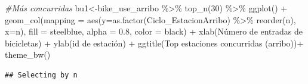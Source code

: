 \documentclass[
]{article}
\newenvironment{Shaded}{\begin{snugshade}}{\end{snugshade}}
\newcommand{\AttributeTok}[1]{\textcolor[rgb]{0.77,0.63,0.00}{#1}}
\newcommand{\CommentTok}[1]{\textcolor[rgb]{0.56,0.35,0.01}{\textit{#1}}}
\newcommand{\DecValTok}[1]{\textcolor[rgb]{0.00,0.00,0.81}{#1}}
\newcommand{\FloatTok}[1]{\textcolor[rgb]{0.00,0.00,0.81}{#1}}
\newcommand{\FunctionTok}[1]{\textcolor[rgb]{0.00,0.00,0.00}{#1}}
\newcommand{\NormalTok}[1]{#1}
\newcommand{\OtherTok}[1]{\textcolor[rgb]{0.56,0.35,0.01}{#1}}
\newcommand{\SpecialCharTok}[1]{\textcolor[rgb]{0.00,0.00,0.00}{#1}}
\newcommand{\StringTok}[1]{\textcolor[rgb]{0.31,0.60,0.02}{#1}}
\begin{document}
\begin{Shaded}
\begin{Highlighting}[]
\CommentTok{\#Más concurridas}
\NormalTok{bu1}\OtherTok{\textless{}{-}}\NormalTok{bike\_use\_arribo }\SpecialCharTok{\%\textgreater{}\%} 
    \FunctionTok{top\_n}\NormalTok{(}\DecValTok{30}\NormalTok{) }\SpecialCharTok{\%\textgreater{}\%} 
    \FunctionTok{ggplot}\NormalTok{() }\SpecialCharTok{+}
    \FunctionTok{geom\_col}\NormalTok{(}\AttributeTok{mapping =} \FunctionTok{aes}\NormalTok{(}\AttributeTok{y=}\FunctionTok{as.factor}\NormalTok{(Ciclo\_EstacionArribo) }\SpecialCharTok{\%\textgreater{}\%} 
                               \FunctionTok{reorder}\NormalTok{(n),}
                           \AttributeTok{x=}\NormalTok{n),}
             \AttributeTok{fill =} \StringTok{\textquotesingle{}steelblue\textquotesingle{}}\NormalTok{,}
             \AttributeTok{alpha =} \FloatTok{0.8}\NormalTok{,}
             \AttributeTok{color =} \StringTok{\textquotesingle{}black\textquotesingle{}}\NormalTok{) }\SpecialCharTok{+}
    \FunctionTok{xlab}\NormalTok{(}\StringTok{\textquotesingle{}Número de entradas de bicicletas\textquotesingle{}}\NormalTok{) }\SpecialCharTok{+}
    \FunctionTok{ylab}\NormalTok{(}\StringTok{\textquotesingle{}id de estación\textquotesingle{}}\NormalTok{) }\SpecialCharTok{+} 
    \FunctionTok{ggtitle}\NormalTok{(}\StringTok{\textquotesingle{}Top estaciones concurridas (arribo)\textquotesingle{}}\NormalTok{)}\SpecialCharTok{+} \FunctionTok{theme\_bw}\NormalTok{()}
\end{Highlighting}
\end{Shaded}

\begin{verbatim}
## Selecting by n
\end{verbatim}
\end{document}

